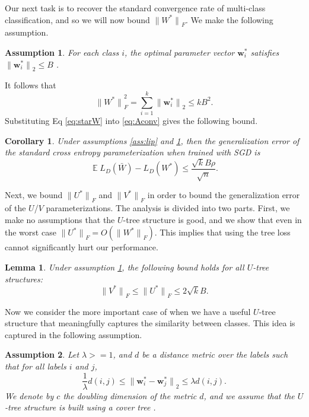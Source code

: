 \documentclass[twoside]{article}
\newtheorem{assumption}{Assumption}
\newtheorem{lemma}{Lemma}
\newtheorem{corollary}{Corollary}
\DeclareMathOperator{\E}{\mathbb E}
\renewcommand{\star}[1]{{#1}^{*}}
\newcommand{\w}{\mathbf w}
\newcommand{\ltwo}[1]{{\lVert {#1} \rVert}_2}
\newcommand{\lF}[1]{{\lVert {#1} \rVert}_F}
\begin{document}
Our next task is to recover the standard convergence rate of multi-class classification, and so we will now bound $\lF{\star W}$.
We make the following assumption.
\begin{assumption}
    \label{ass:B}
    For each class $i$, the optimal parameter vector $\star\w_i$ satisfies
        $\ltwo{\star\w_i} \le B$
        .
\end{assumption}
It follows that
\begin{equation}
    \lF{\star W}^2 = \sum_{i=1}^k \ltwo{\star\w_i} \le kB^2.
    \label{eq:starW}
\end{equation}
Substituting Eq \eqref{eq:starW} into \eqref{eq:Aconv} gives the following bound.
\begin{corollary}
\label{theorem:xentropy}
    Under assumptions \ref{ass:lip} and \ref{ass:B},
    then the generalization error of the standard cross entropy parameterization when trained with SGD is
\begin{equation}
    \E L_D(\bar W) - L_D(W^*)
    \le \frac {\sqrt kB\rho}{\sqrt n}
    .
\end{equation}
\end{corollary}

Next, we bound $\lF{\star U}$ and $\lF{\star V}$ in order to bound the generalization error of the $U$/$V$ parameterizations.
The analysis is divided into two parts.
First, we make no assumptions that the $U$-tree structure is good,
and we show that even in the worst case $\lF{\star U} = O(\lF{\star W})$.
This implies that using the tree loss cannot significantly hurt our performance.
\begin{lemma}
    \label{lemma:starU}
    Under assumption \ref{ass:B},
    the following bound holds for all $U$-tree structures:
    \begin{equation}
        \lF{\star V} \le \lF{\star U} \le 2\sqrt{k}B.
    \end{equation}
\end{lemma}
Now we consider the more important case of when we have a useful $U$-tree structure that meaningfully captures the similarity between classes.
This idea is captured in the following assumption.
\begin{assumption}
    \label{ass:metric}
    Let $\lambda >= 1$, and $d$ be a distance metric over the labels such that for all labels $i$ and $j$,
\begin{equation}
    \frac 1 \lambda d(i,j)
    \le \ltwo{\star \w_i - \star \w_j}
    \le \lambda d(i, j).
\end{equation}
We denote by $c$ the doubling dimension of the metric $d$,
and we assume that the $U$-tree structure is built using a cover tree \citep{beygelzimer2006cover}.
\end{assumption}
\end{document}

